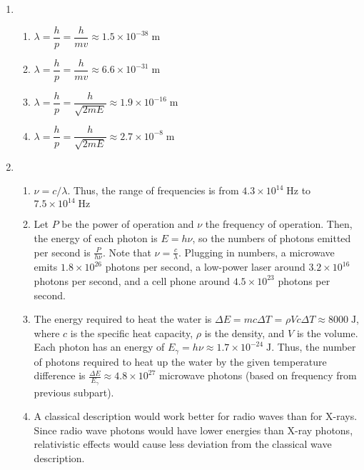 \begin{sol}
\begin{enumerate}[label=(\alph*)]
\item
    \begin{enumerate}[label=(\roman*)]
    \item $\lambda = \dfrac{h}{p} = \dfrac{h}{mv} \approx 1.5 \times 10^{-38}\;\mathrm{m}$
    \item $\lambda = \dfrac{h}{p} = \dfrac{h}{mv} \approx 6.6 \times 10^{-31}\;\mathrm{m}$
    \item $\lambda = \dfrac{h}{p} = \dfrac{h}{\sqrt{2mE}} \approx 1.9 \times 10^{-16}\;\mathrm{m}$
    \item $\lambda = \dfrac{h}{p} = \dfrac{h}{\sqrt{2mE}} \approx 2.7 \times 10^{-8}\;\mathrm{m}$
    \end{enumerate}
    \item
    \begin{enumerate}[label=(\roman*)]
    \item $\nu = c/\lambda$. Thus, the range of frequencies is from $4.3 \times 10^{14}\;\mathrm{Hz}$ to $7.5 \times 10^{14}\;\mathrm{Hz}$
    \item Let $P$ be the power of operation and $\nu$ the frequency of operation. Then, the energy of each photon is $E = h\nu$, so the numbers of photons emitted per second is $\frac{P}{h\nu}$. Note that $\nu = \frac{c}{\lambda}$. Plugging in numbers, a microwave emits $1.8 \times 10^{26}$ photons per second, a low-power laser around $3.2 \times 10^{16}$ photons per second, and a cell phone around $4.5 \times 10^{23}$ photons per second.
    \item The energy required to heat the water is $\Delta E = mc\Delta T$ = $\rho Vc\Delta T \approx 8000\;\mathrm{J}$, where $c$ is the specific heat capacity, $\rho$ is the density, and $V$ is the volume. Each photon has an energy of $E_{\gamma} = h\nu \approx 1.7 \times 10^{-24}\;\mathrm{J}$. Thus, the number of photons required to heat up the water by the given temperature difference is $\frac{\Delta E}{E_{\gamma}} \approx 4.8 \times 10^{27}$ microwave photons (based on frequency from previous subpart).
    \item A classical description would work better for radio waves than for X-rays. Since radio wave photons would have lower energies than X-ray photons, relativistic effects would cause less deviation from the classical wave description.
    \end{enumerate}
    \end{enumerate}
\end{sol}